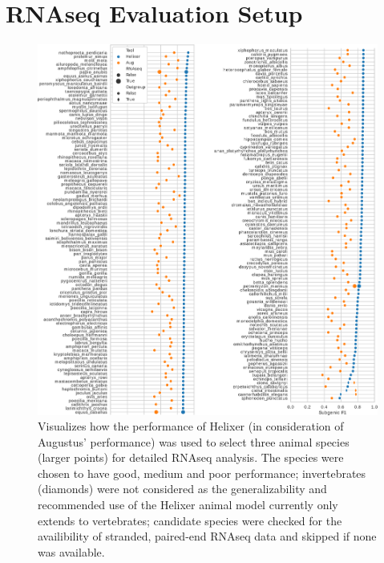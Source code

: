 \documentclass{article}
\begin{document}
\section{RNAseq Evaluation Setup}
\label{sec:rnaseq_setup}
\begin{figure}[!h]
\label{supfig:rna_select_animals}
\centerline{\includegraphics[width=1.0\textwidth]{images/RNAseq_animals_fit}}
\caption{Visualizes how the performance of Helixer (in consideration of Augustus' performance)
was used to select three animal species (larger points) for detailed RNAseq analysis. The 
species were chosen to have good, medium and poor performance; invertebrates (diamonds) were
not considered as the generalizability and recommended use of the Helixer animal model
currently only extends to vertebrates; candidate species were checked for the availibility of
stranded, paired-end RNAseq data and skipped if none was available.}
\end{figure}
\end{document}

